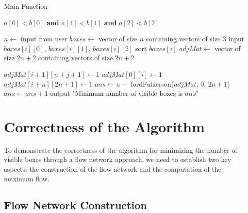 \documentclass{article}
\begin{document}
\begin{algorithm}[H]
\caption{Main Function}
\begin{algorithmic}[1]

\State
{}
    \State \Return $a[0] < b[0]$ \textbf{and} $a[1] < b[1]$ \textbf{and} $a[2] < b[2]$
\EndFunction
\State

    \State $n \gets$ input from user
    \State $boxes \gets$ vector of size $n$ containing vectors of size 3
        \State input $boxes[i][0]$, $boxes[i][1]$, $boxes[i][2]$
        \State sort $boxes[i]$
    \EndFor
    \State $adjMat \gets$ vector of size $2n + 2$ containing vectors of size $2n + 2$
    
                \State $adjMat[i+1][n+j+1] \gets 1$
            \EndIf
        \EndFor
    \EndFor
        \State $adjMat[0][i] \gets 1$
        \State $adjMat[i + n][2n + 1] \gets 1$
    \EndFor
    \State $ans \gets n -$ fordFulkerson($adjMat$, 0, $2n + 1$)
        \State $ans \gets ans + 1$
    \EndIf
    \State output "Minimum number of visible boxes is $ans$"
\EndFunction
\end{algorithmic}
\end{algorithm}



\newpage


\clearpage

\section{Correctness of the Algorithm}

To demonstrate the correctness of the algorithm for minimizing the number of visible boxes through a flow network approach, we need to establish two key aspects: the construction of the flow network and the computation of the maximum flow.

\subsection*{Flow Network Construction}
\end{document}
